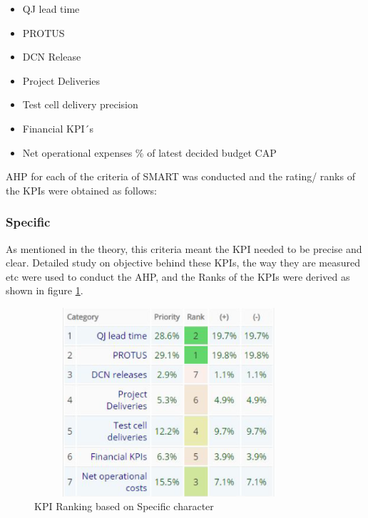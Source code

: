 \begin{itemize}
    \item QJ lead time
    \item PROTUS
    \item DCN Release
    \item Project Deliveries
    \item Test cell delivery precision
    \item Financial KPI´s
    \item Net operational expenses \% of latest decided budget CAP

\end{itemize}
AHP for each of the criteria of SMART was conducted and the rating/ ranks of the KPIs were obtained as follows: 
\subsubsection{Specific}
As mentioned in the theory, this criteria meant the KPI needed to be precise and clear. Detailed study on objective behind these KPIs, the way they are measured etc were used to conduct the AHP, and the Ranks of the KPIs were derived as shown in figure \ref{fig:6.1}.\\

\begin{figure}[H]
    \centering
    \captionsetup{justification=centering, margin=2cm}
    \vspace{1cm}
    \includegraphics[width=10cm, height=7cm]{figure/auxiliary/fig61.PNG}
    \caption{KPI Ranking based on Specific character}
    \label{fig:6.1}
\end{figure}


